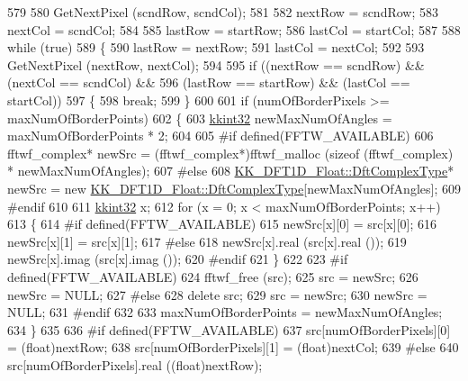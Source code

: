 \begin{DoxyCode}
579 
580   GetNextPixel (scndRow, scndCol);
581 
582   nextRow = scndRow;
583   nextCol = scndCol;
584 
585   lastRow = startRow;
586   lastCol = startCol;
587 
588   \textcolor{keywordflow}{while}  (\textcolor{keyword}{true})  
589   \{
590     lastRow = nextRow;
591     lastCol = nextCol;
592 
593     GetNextPixel (nextRow, nextCol);
594 
595     \textcolor{keywordflow}{if}  ((nextRow == scndRow)   &&  (nextCol == scndCol)  &&
596          (lastRow == startRow)  &&  (lastCol == startCol))
597     \{
598       \textcolor{keywordflow}{break};
599     \}
600 
601     \textcolor{keywordflow}{if}  (numOfBorderPixels >= maxNumOfBorderPoints)
602     \{
603       \hyperlink{namespace_k_k_b_a8fa4952cc84fda1de4bec1fbdd8d5b1b}{kkint32}  newMaxNumOfAngles = maxNumOfBorderPoints * 2;
604 
605 \textcolor{preprocessor}{      #if  defined(FFTW\_AVAILABLE)}
606         fftwf\_complex*  newSrc = (fftwf\_complex*)fftwf\_malloc (\textcolor{keyword}{sizeof} (fftwf\_complex) * newMaxNumOfAngles);
607 \textcolor{preprocessor}{      #else}
608         \hyperlink{class_k_k_b_1_1_k_k___d_f_t1_d_a4cbc827157dd30ddec2d3753e552a827}{KK\_DFT1D\_Float::DftComplexType}*  newSrc = \textcolor{keyword}{new} 
      \hyperlink{class_k_k_b_1_1_k_k___d_f_t1_d_a4cbc827157dd30ddec2d3753e552a827}{KK\_DFT1D\_Float::DftComplexType}[newMaxNumOfAngles];
609 \textcolor{preprocessor}{      #endif}
610 
611       \hyperlink{namespace_k_k_b_a8fa4952cc84fda1de4bec1fbdd8d5b1b}{kkint32}  x;
612       \textcolor{keywordflow}{for}  (x = 0; x < maxNumOfBorderPoints; x++)
613       \{
614 \textcolor{preprocessor}{        #if  defined(FFTW\_AVAILABLE)}
615           newSrc[x][0] = src[x][0];
616           newSrc[x][1] = src[x][1];
617 \textcolor{preprocessor}{        #else}
618           newSrc[x].real (src[x].real ());
619           newSrc[x].imag (src[x].imag ());
620 \textcolor{preprocessor}{        #endif}
621       \}
622 
623 \textcolor{preprocessor}{      #if  defined(FFTW\_AVAILABLE)}
624         fftwf\_free (src);
625         src = newSrc;
626         newSrc = NULL;
627 \textcolor{preprocessor}{      #else}
628         \textcolor{keyword}{delete}  src;
629         src = newSrc;
630         newSrc = NULL;
631 \textcolor{preprocessor}{      #endif}
632 
633       maxNumOfBorderPoints = newMaxNumOfAngles;
634     \}
635 
636 \textcolor{preprocessor}{    #if  defined(FFTW\_AVAILABLE)}
637       src[numOfBorderPixels][0] = (float)nextRow;
638       src[numOfBorderPixels][1] = (float)nextCol;
639 \textcolor{preprocessor}{    #else}
640       src[numOfBorderPixels].real ((\textcolor{keywordtype}{float})nextRow);

\end{DoxyCode}
